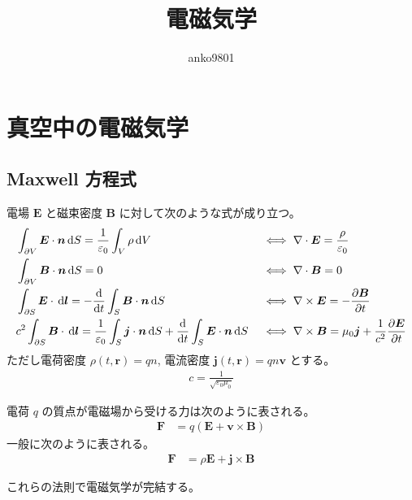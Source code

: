 \documentclass[uplatex,dvipdfmx,a4paper,11pt]{jlreq}
\title{電磁気学}
\author{anko9801}
\newcommand{\EE}{\bm{E}}
\newcommand{\BB}{\bm{B}}
\newcommand{\rr}{\bm{r}}
\newcommand{\vnabla}{\mathbf{\nabla}}
\numberwithin{equation}{section}
\theoremstyle{definition}
\begin{document}
\maketitle
\tableofcontents
\clearpage



\section{真空中の電磁気学}
\subsection{Maxwell 方程式}
\begin{definition}
  電場 $\EE$ と磁束密度 $\BB$ に対して次のような式が成り立つ。
  \begin{align}
     & \int_{\partial V}\EE\cdot\bm{n}\dl{S} = \frac{1}{\varepsilon_0}\int_V\rho\dl{V}                                                       &  & \iff \vnabla\cdot\EE  = \frac{\rho}{\varepsilon_0}                               \\
     & \int_{\partial V}\BB\cdot\bm{n}\dl{S} = 0                                                                                             &  & \iff \vnabla\cdot\BB  = 0                                                        \\
     & \int_{\partial S}\EE\cdot\dl{\bm{l}} = -\diff{}{t}\int_S\BB\cdot\bm{n}\dl{S}                                                          &  & \iff \vnabla\times\EE = -\diffp{\BB}{t}                                          \\
     & c^2\int_{\partial S}\BB\cdot\dl{\bm{l}} = \frac{1}{\varepsilon_0}\int_S\bm{j}\cdot\bm{n}\dl{S} + \diff{}{t}\int_S\EE\cdot\bm{n}\dl{S} &  & \iff \vnabla\times\BB = \mu_0\bm{j} + \frac{1}{c^2}\diffp{\EE}{t} \label{Ampere}
  \end{align}
  ただし電荷密度 $\rho(t, \rr) = qn$, 電流密度 $\bm{j}(t, \rr) = qn\bm{v}$ とする。
  \begin{align}
    c = \frac{1}{\sqrt{\varepsilon_0\mu_0}}
  \end{align}
\end{definition}
\begin{definition}[Lorentz 力]
  電荷 $q$ の質点が電磁場から受ける力は次のように表される。
  \begin{align}
    \bm{F} & = q(\EE + \bm{v}\times\BB)
  \end{align}
  一般に次のように表される。
  \begin{align}
    \bm{F} & = \rho\EE + \bm{j}\times\BB
  \end{align}
\end{definition}
これらの法則で電磁気学が完結する。
\end{document}
